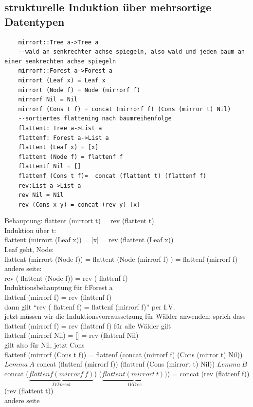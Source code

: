 \documentclass{article}
\theoremstyle{definition}
\begin{document}
	\subsection{strukturelle Induktion über mehrsortige Datentypen}
	\begin{verbatim}
	mirrort::Tree a->Tree a
	--wald an senkrechter achse spiegeln, also wald und jeden baum an einer senkrechten achse spiegeln
	mirrorf::Forest a->Forest a
	mirrort (Leaf x) = Leaf x
	mirrort (Node f) = Node (mirrorf f)
	mirrorf Nil = Nil
	mirrorf (Cons t f) = concat (mirrorf f) (Cons (mirror t) Nil)
	--sortiertes flattening nach baumreihenfolge
	flattent: Tree a->List a
	flattenf: Forest a->List a
	flattent (Leaf x) = [x]
	flattent (Node f) = flattenf f
	flattentf Nil = []
	flattenf (Cons t f)=  concat (flattent t) (flattenf f)
	rev:List a->List a
	rev Nil = Nil
	rev (Cons x y) = concat (rev y) [x]
	\end{verbatim}
	Behauptung: flattent (mirrort t) = rev (flattent t)\\
	Induktion über t:\\
	flattent (mirrort (Leaf x)) = [x] = rev (flattent (Leaf x))\\
	Leaf geht, Node:\\
	flattent (mirrort (Node f)) = flattent (Node (mirrorf f) ) = flattenf (mirrorf f)\\
	andere seite:\\
	rev ( flattent (Node f)) = rev ( flattenf f)\\
	Induktionsbehauptung für f:Forest a\\
	flattenf (mirrorf f) = rev (flattenf f)\\
	dann gilt ``rev ( flattenf f) =  flattenf (mirrorf f)'' per I.V.\\
	jetzt müssen wir die Induktionsvorraussetzung für Wälder anwenden: sprich dass flattenf (mirrorf f) = rev (flattenf f) für alle Wälder gilt\\
	flattenf (mirrorf Nil) = [] = rev (flattenf Nil)\\
	gilt also für Nil, jetzt Cons\\
	flattenf (mirrorf (Cons t f)) = flattenf (concat (mirrorf f) (Cons (mirror t) Nil)) $\stackrel{=}{Lemma\ A}$ concat (flattenf (mirrorf f)) (flattenf (Cons (mirrort t) Nil))
	$\stackrel{=}{Lemma\ B}$ concat ($\underbrace{flattenf (mirrorf\ f)}_{IV Forest}$) ($\underbrace{flattent (mirrort\ t))}_{IV Tree}$) = concat (rev (flattenf f)) (rev (flattent t))\\
	andere seite\\
\end{document}

